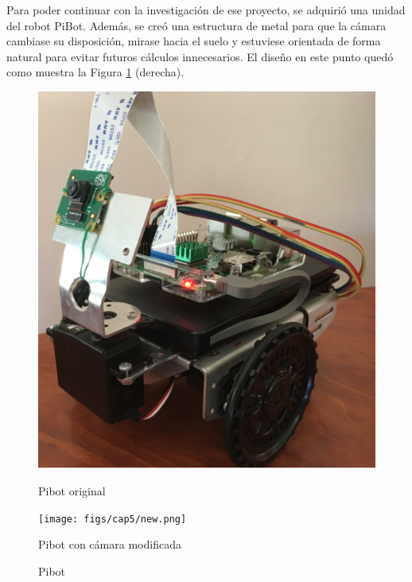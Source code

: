 
Para poder continuar con la investigación de ese proyecto, se adquirió una unidad del robot PiBot. Además, se creó una estructura de metal para que la cámara cambiase su disposición, mirase hacia el suelo y estuviese orientada de forma natural para evitar futuros cálculos innecesarios. El diseño en este punto quedó como muestra la Figura \ref{fig:pibot} (derecha).



\begin{figure}[ht!]
	\centering
	\begin{minipage}{0.3\linewidth}
		\centering
		\includegraphics[width=\linewidth]{figs/cap5/Original.png}
		\caption*{\centering Pibot original}
	\end{minipage}
	\hspace{2cm}
	\begin{minipage}{0.4\linewidth}
		\centering
		\texttt{[image: figs/cap5/new.png]}
		\caption*{\centering Pibot con cámara modificada}
	\end{minipage}
	\caption{Pibot}
	\label{fig:pibot}
\end{figure}


